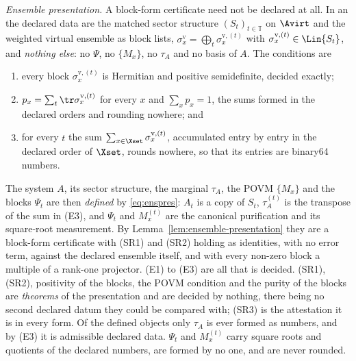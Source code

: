 \begin{definition}
\emph{Ensemble presentation.} A block-form certificate need not be declared
at all. In an  the declared data are the matched
sector structure $(S_t)_{t\in\mathbb{T}}$ on $\Avirt$ and the weighted
virtual ensemble as block lists,
$\sigma^{\mathrm v}_x=\bigoplus_t\sigma^{\mathrm v,(t)}_x$ with
$\sigma^{\mathrm v,(t)}_x\in\Lin{S_t}$, and \emph{nothing else}: no $\Psi$,
no $\{M_x\}$, no $\tau_A$ and no basis of $A$. The conditions are
\begin{enumerate}[label=(E\arabic*),leftmargin=3.0em]
\item every block $\sigma^{\mathrm v,(t)}_x$ is Hermitian and positive
semidefinite, decided exactly;
\item $p_x=\sum_t\tr\sigma^{\mathrm v,(t)}_x$ for every $x$ and
$\sum_xp_x=1$, the sums formed in the declared orders and rounding nowhere;
and
\item for every $t$ the sum $\sum_{x\in\Xset}\sigma^{\mathrm v,(t)}_x$,
accumulated entry by entry in the declared order of $\Xset$, rounds nowhere,
so that its entries are binary64 numbers.
\end{enumerate}
The system $A$, its sector structure, the marginal $\tau_A$, the POVM
$\{M_x\}$ and the blocks $\Psi_t$ are then \emph{defined} by
\eqref{eq:enspres}: $A_t$ is a copy of $S_t$, $\tau^{(t)}_A$ is the
transpose of the sum in (E3), and $\Psi_t$ and $M^{(t)}_x$ are the canonical
purification and its square-root measurement. By
Lemma~\ref{lem:ensemble-presentation} they are a block-form certificate
with (SR1) and (SR2) holding as identities, with no error term, against the
declared ensemble itself, and with every non-zero block a multiple of a
rank-one projector.
(E1) to (E3) are all that is decided. (SR1), (SR2), positivity of the
blocks, the POVM condition and the purity of the blocks are \emph{theorems}
of the presentation and are decided by nothing, there being no second
declared datum they could be compared with; (SR3) is the attestation it is
in every form. Of the defined objects only $\tau_A$ is ever formed as
numbers, and by (E3) it is admissible declared data. $\Psi_t$ and
$M^{(t)}_x$ carry square roots and quotients of the declared numbers, are
formed by no one, and are never rounded.


\end{definition}

